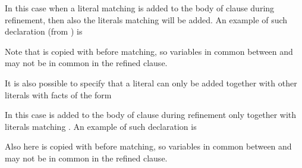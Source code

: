 \documentclass[letterpaper,10pt,english]{sphinxmanual}
\begin{document}
In this case when a literal matching  is added to the body of clause during refinement, then also the literals matching  will be added. An example of such declaration (from ) is

\begin{sphinxVerbatim}[commandchars=\\\{\}]
\PYG{p}{[}\PYG{p}{]}
\end{sphinxVerbatim}

Note that  is copied with  before matching, so variables in common between  and  may not be in common in the refined clause.

It is also possible to specify that a literal can only be added together with other literals with facts of the form

\begin{sphinxVerbatim}[commandchars=\\\{\}]
  
\end{sphinxVerbatim}

In this case  is added to the body of clause during refinement only together with literals matching .
An example of such declaration is

\begin{sphinxVerbatim}[commandchars=\\\{\}]
\PYG{p}{[}\PYG{p}{]}
\end{sphinxVerbatim}

Also here  is copied with  before matching, so variables in common between  and  may not be in common in the refined clause.
\end{document}
